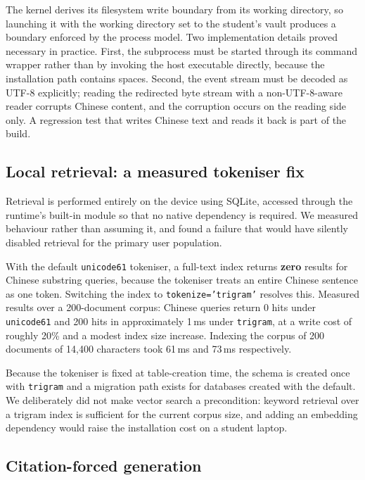 \documentclass[11pt,a4paper]{article}
\begin{document}
The kernel derives its filesystem write boundary from its working directory, so launching it
with the working directory set to the student's vault produces a boundary enforced by the
process model. Two implementation details proved necessary in practice. First, the
subprocess must be started through its command wrapper rather than by invoking the host
executable directly, because the installation path contains spaces. Second, the event stream
must be decoded as UTF-8 explicitly; reading the redirected byte stream with a
non-UTF-8-aware reader corrupts Chinese content, and the corruption occurs on the reading
side only. A regression test that writes Chinese text and reads it back is part of the
build.

\subsection{Local retrieval: a measured tokeniser fix}

Retrieval is performed entirely on the device using SQLite, accessed through the runtime's
built-in module so that no native dependency is required. We measured behaviour rather than
assuming it, and found a failure that would have silently disabled retrieval for the primary
user population.

With the default \texttt{unicode61} tokeniser, a full-text index returns \textbf{zero}
results for Chinese substring queries, because the tokeniser treats an entire Chinese
sentence as one token. Switching the index to \texttt{tokenize='trigram'} resolves this.
Measured results over a 200-document corpus: Chinese queries return 0 hits under
\texttt{unicode61} and 200 hits in approximately 1\,ms under \texttt{trigram}, at a write
cost of roughly 20\% and a modest index size increase. Indexing the corpus of 200 documents
of 14{,}400 characters took 61\,ms and 73\,ms respectively.

Because the tokeniser is fixed at table-creation time, the schema is created once with
\texttt{trigram} and a migration path exists for databases created with the default. We
deliberately did not make vector search a precondition: keyword retrieval over a trigram
index is sufficient for the current corpus size, and adding an embedding dependency would
raise the installation cost on a student laptop.

\subsection{Citation-forced generation}
\end{document}
